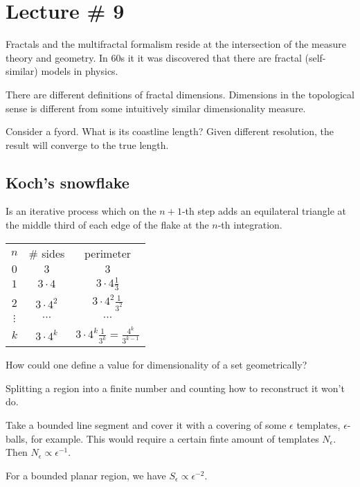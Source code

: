 \documentclass[a4paper]{article}
\begin{document}

\section{Lecture \# 9} %
\label{sec:lecture_9}

Fractals and the multifractal formalism reside at the intersection of the measure theory and geometry. In 60s it it was discovered that there are fractal (self-similar) models in physics.

There are different definitions of fractal dimensions.
Dimensions in the topological sense is different from some intuitively similar dimensionality measure.

Consider a fyord. What is its coastline length? Given different resolution, the result will converge to the true length.

\subsection{Koch's snowflake} %
\label{sub:koch_s_snowflake}

Is an iterative process which on the $n+1$-th step adds an equilateral triangle at the middle third of each edge of the flake at the $n$-th integration.

\begin{tabular}{c|c|c}
$n$ & \# sides & perimeter \\
$0$ & $3$ & $3$ \\
$1$ & $3\cdot 4$ & $3 \cdot 4 \frac{1}{3}$ \\
$2$ & $3\cdot 4^2$ & $3 \cdot 4^2 \frac{1}{3^2}$ \\
$\vdots$ & $\cdots$ & $\cdots$\\
$k$ & $3 \cdot 4^k$ & $3 \cdot 4^k \frac{1}{3^k} = \frac{4^k}{3^{k-1}}$
\end{tabular}


How could one define a value for dimensionality of a set geometrically?

Splitting a region into a finite number and counting how to reconstruct it won't do.


Take a bounded line segment and cover it with a covering of some $\epsilon$ templates, $\epsilon$-balls, for example. This would require a certain finte amount of templates $N_\epsilon$. Then $N_\epsilon\propto \epsilon^{-1}$.

For a bounded planar region, we have $S_\epsilon\propto \epsilon^{-2}$.
\end{document}
